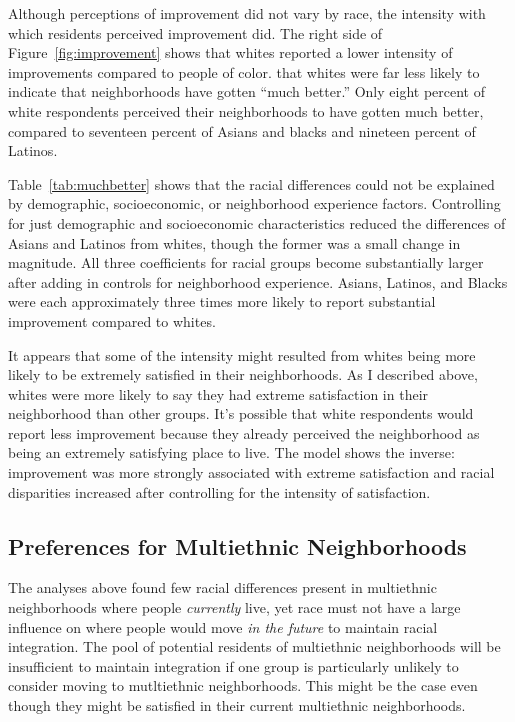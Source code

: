 \documentclass[11pt]{baderart}
\begin{document}

Although perceptions of improvement did not vary by race, the intensity with which residents perceived improvement did. The right side of Figure~\ref{fig:improvement} shows that whites reported a lower intensity of improvements compared to people of color. that whites were far less likely to indicate that neighborhoods have gotten ``much better.'' Only eight percent of white respondents perceived their neighborhoods to have gotten much better, compared to seventeen percent of Asians and blacks and nineteen percent of Latinos. 


Table~\ref{tab:muchbetter} shows that the racial differences could not be explained by demographic, socioeconomic, or neighborhood experience factors. Controlling for just demographic and socioeconomic characteristics reduced the differences of Asians and Latinos from whites, though the former was a small change in magnitude. All three coefficients for racial groups become substantially larger after adding in controls for neighborhood experience. Asians, Latinos, and Blacks were each approximately three times more likely to report substantial improvement compared to whites. 


It appears that some of the intensity might resulted from whites being more likely to be extremely satisfied in their neighborhoods. As I described above, whites were more likely to say they had extreme satisfaction in their neighborhood than other groups. It's possible that white respondents would report less improvement because they already perceived the neighborhood as being an extremely satisfying place to live. The model shows the inverse: improvement was more strongly associated with extreme satisfaction and racial disparities increased after controlling for the intensity of satisfaction. 

\subsection{Preferences for Multiethnic Neighborhoods}
The analyses above found few racial differences present in multiethnic neighborhoods where people \emph{currently} live, yet race must not have a large influence on where people would move \emph{in the future} to maintain racial integration. The pool of potential residents of multiethnic neighborhoods will be insufficient to maintain integration if one group is particularly unlikely to consider moving to mutltiethnic neighborhoods. This might be the case even though they might be satisfied in their current multiethnic neighborhoods. 
\end{document}
